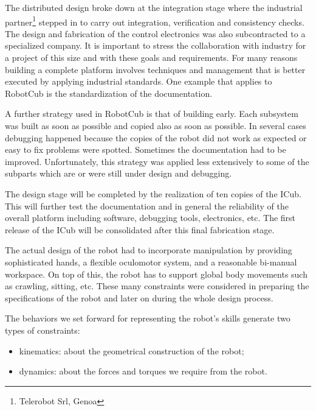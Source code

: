 The distributed design broke down at the integration stage where the industrial 
partner\footnote{Telerobot Srl, Genoa} stepped in to carry out integration, 
verification and consistency checks. The design and fabrication of the control 
electronics was also subcontracted to a specialized company.
It is important to stress the collaboration with industry for a project of this
size and with these goals and requirements. For many reasons building a complete 
platform involves techniques and management that is better executed by applying 
industrial standards. One example that applies to RobotCub is the standardization 
of the documentation.

A further strategy used in RobotCub is that of building early. Each subsystem
was built as soon as possible and copied also as soon as possible. In several cases
debugging happened because the copies of the robot did not work as expected or
easy to fix problems were spotted. Sometimes the documentation had to be improved.
Unfortunately, this strategy was applied less extensively to some of the subparts 
which are or were still under design and debugging. 

The design stage will be completed by the realization of ten copies of the ICub.
This will further test the documentation and in general the reliability of the
overall platform including software, debugging tools, electronics, etc. The first
release of the ICub will be consolidated after this final fabrication stage.

The actual design of the robot had to incorporate manipulation by providing 
sophisticated hands, a flexible oculomotor system, and a reasonable bi-manual 
workspace. On top of this, the robot has to support global body movements such as 
crawling, sitting, etc. These many constraints were considered in preparing 
the specifications of the robot and later on during the whole design process.

The behaviors we set forward for representing the robot's skills generate two 
types of constraints:
\begin{itemize}
	\item kinematics: about the geometrical construction of the robot;
	\item dynamics: about the forces and torques we require from the robot.
\end{itemize}

